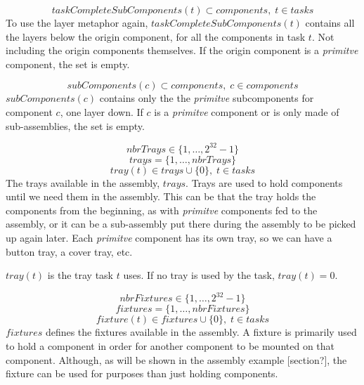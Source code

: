  \begin{equation}\label{eq:54}
 taskCompleteSubComponents(t) \subset components, \; t \in tasks\end{equation}
 To use the layer metaphor again, $taskCompleteSubComponents(t)$ contains all the layers below the origin component, for all the components in task $t$. Not including the origin components themselves. If the origin component is a \emph{primitve} component, the set is empty.
 
 \begin{equation}\label{eq:55}
 subComponents(c) \subset components, \; c \in components\end{equation}
 $subComponents(c)$ contains only the the \emph{primitve} subcomponents for component $c$, one layer down. If $c$ is a \emph{primitve} component or is only made of sub-assemblies, the set is empty.
 
 \begin{equation}\label{eq:4}
 nbrTrays \in \{1 , \ldots , 2^{32}-1\}
 \end{equation}
 \begin{equation}\label{eq:14}
 trays = \{1 , \ldots , nbrTrays\}
 \end{equation}
 \begin{equation}\label{eq:22}
 tray(t) \in trays \cup \{0\}, \; t \in tasks
 \end{equation}
 The trays available in the assembly, $trays$. Trays are used to hold components until we need them in the assembly. This can be that the tray holds the components from the beginning, as with \emph{primitve} components fed to the assembly, or it can be a sub-assembly put there during the assembly to be picked up again later. Each \emph{primitve} component has its own tray, so we can have a button tray, a cover tray, etc.
 
 $tray(t)$ is the tray task $t$ uses. If no tray is used by the task, $tray(t) = 0$.
 
 
 \begin{equation}\label{eq:5}
 nbrFixtures \in \{1 , \ldots , 2^{32}-1\}
 \end{equation}
 \begin{equation}\label{eq:15}
 fixtures = \{1 , \ldots , nbrFixtures\}
 \end{equation}
 \begin{equation}\label{eq:24}
 fixture(t) \in fixtures \cup \{0\}, \; t \in tasks
 \end{equation}
 $fixtures$ defines the fixtures available in the assembly. A fixture is primarily used to hold a component in order for another component to be mounted on that component. Although, as will be shown in the assembly example [section?], the fixture can be used for purposes than just holding components.
 
